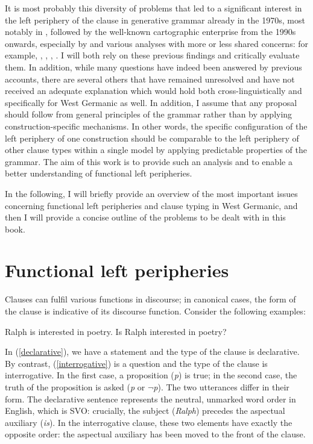 It is most probably this diversity of problems that led to a significant interest in the left periphery of the clause in generative grammar already in the 1970s, most notably in \citet{chomskylasnik1977}, followed by the well-known cartographic enterprise from the 1990s onwards, especially by \citet{rizzi1997, rizzi2004} and various analyses with more or less shared concerns: for example, \citet{sobin2002}, \citet{poletto2006}, \citet{bayerbrandner2008}, \citet{brandnerbraeuning2013}. I will both rely on these previous findings and critically evaluate them. In addition, while many questions have indeed been answered by previous accounts, there are several others that have remained unresolved and have not received an adequate explanation which would hold both cross-linguistically and specifically for West Germanic as well. In addition, I assume that any proposal should follow from general principles of the grammar rather than by applying construction-specific mechanisms. In other words, the specific configuration of the left periphery of one construction should be comparable to the left periphery of other clause types within a single model by applying predictable properties of the grammar. The aim of this work is to provide such an analysis and to enable a better understanding of functional left peripheries.

In the following, I will briefly provide an overview of the most important issues concerning functional left peripheries and clause typing in West Germanic, and then I will provide a concise outline of the problems to be dealt with in this book.

\section{Functional left peripheries} \label{sec:1functional}
Clauses can fulfil various functions in discourse; in canonical cases, the form of the clause is indicative of its discourse function. Consider the following examples:

\ea \label{clauses}
\ea Ralph is interested in poetry. \label{declarative}
\ex Is Ralph interested in poetry? \label{interrogative}
\z
\z

In (\ref{declarative}), we have a statement and the type of the clause is declarative. By contrast, (\ref{interrogative}) is a question and the type of the clause is interrogative. In the first case, a proposition (\textit{p}) is true; in the second case, the truth of the proposition is asked (\textit{p} or $\neg$\textit{p}). The two utterances differ in their form. The declarative sentence represents the neutral, unmarked word order in English, which is SVO: crucially, the subject (\textit{Ralph}) precedes the aspectual auxiliary (\textit{is}). In the interrogative clause, these two elements have exactly the opposite order: the aspectual auxiliary has been moved to the front of the clause.

